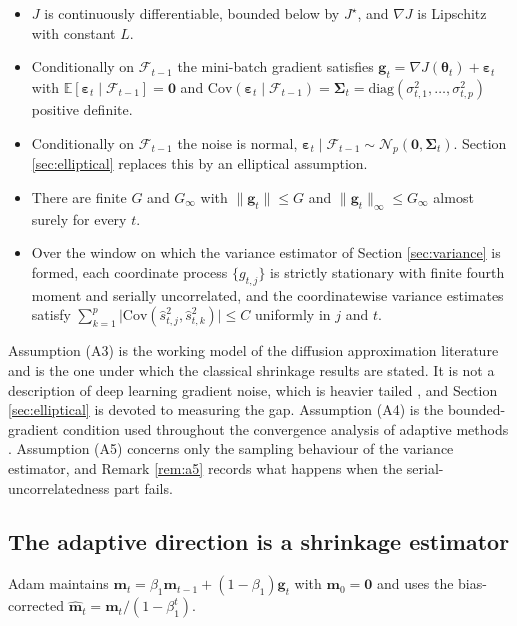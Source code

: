 \documentclass[pdflatex,sn-mathphys-num]{sn-jnl}%
\theoremstyle{thmstyleone}%
\theoremstyle{thmstyletwo}%
\theoremstyle{thmstylethree}%
\newcommand{\Cov}{\mathrm{Cov}}
\newcommand{\diag}{\mathrm{diag}}
\newcommand{\E}{\mathbb{E}}
\begin{document}
\begin{itemize}
\item[(A1)] $J$ is continuously differentiable, bounded below by $J^\star$, and $\nabla J$ is Lipschitz with constant $L$.
\item[(A2)] Conditionally on $\mathcal F_{t-1}$ the mini-batch gradient satisfies $\bm g_t=\nabla J(\bm\theta_t)+\bm\varepsilon_t$ with $\E[\bm\varepsilon_t\mid\mathcal F_{t-1}]=\bm 0$ and $\Cov(\bm\varepsilon_t\mid\mathcal F_{t-1})=\bm\Sigma_t=\diag(\sigma^2_{t,1},\dots,\sigma^2_{t,p})$ positive definite.
\item[(A3)] Conditionally on $\mathcal F_{t-1}$ the noise is normal, $\bm\varepsilon_t\mid\mathcal F_{t-1}\sim\mathcal N_p(\bm 0,\bm\Sigma_t)$. Section \ref{sec:elliptical} replaces this by an elliptical assumption.
\item[(A4)] There are finite $G$ and $G_\infty$ with $\|\bm g_t\|\le G$ and $\|\bm g_t\|_\infty\le G_\infty$ almost surely for every $t$.
\item[(A5)] Over the window on which the variance estimator of Section \ref{sec:variance} is formed, each coordinate process $\{g_{t,j}\}$ is strictly stationary with finite fourth moment and serially uncorrelated, and the coordinatewise variance estimates satisfy $\sum_{k=1}^{p}\bigl|\Cov(\hat s^2_{t,j},\hat s^2_{t,k})\bigr|\le C$ uniformly in $j$ and $t$.
\end{itemize}

Assumption (A3) is the working model of the diffusion approximation literature \cite{mandt2017} and is the one under which the classical shrinkage results are stated. It is not a description of deep learning gradient noise, which is heavier tailed \cite{simsekli2019, gurbuzbalaban2021}, and Section \ref{sec:elliptical} is devoted to measuring the gap. Assumption (A4) is the bounded-gradient condition used throughout the convergence analysis of adaptive methods \cite{reddi2018, chen2019, defossez2022}. Assumption (A5) concerns only the sampling behaviour of the variance estimator, and Remark \ref{rem:a5} records what happens when the serial-uncorrelatedness part fails.

\subsection{The adaptive direction is a shrinkage estimator}

Adam maintains $\bm m_t=\beta_1\bm m_{t-1}+(1-\beta_1)\bm g_t$ with $\bm m_0=\bm 0$ and uses the bias-corrected $\hat{\bm m}_t=\bm m_t/(1-\beta_1^{t})$.
\end{document}
